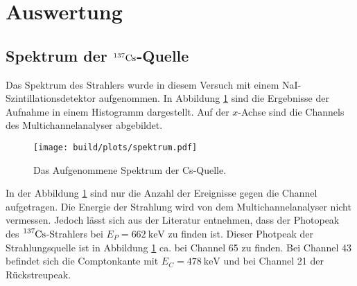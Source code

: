 \newpage 
\section{Auswertung}

  \subsection{Spektrum der $^{137}\text{Cs}$-Quelle}
    Das Spektrum des Strahlers wurde in diesem Versuch mit einem NaI-Szintillationsdetektor aufgenommen. 
    In Abbildung \ref{fig:Spektrum} sind die Ergebnisse der Aufnahme in einem Histogramm dargestellt. Auf der $x$-Achse sind die Channels des Multichannelanalyser abgebildet.
    \begin{figure}[H]
      \centering  
      \texttt{[image: build/plots/spektrum.pdf]}
      \caption{Das Aufgenommene Spektrum der Cs-Quelle.}
      \label{fig:Spektrum}
    \end{figure}

    \noindent In der Abbildung \ref{fig:Spektrum} sind nur die Anzahl der Ereignisse gegen die Channel aufgetragen. 
    Die Energie der Strahlung wird von dem Multichannelanalyser nicht vermessen. 
    Jedoch lässt sich aus der Literatur \cite{Peak} entnehmen, dass der Photopeak des $\ce{^{137}Cs}$-Strahlers bei $E_P = \SI{662}{\kilo\electronvolt}$ zu finden ist.
    Dieser Photpeak der Strahlungsquelle ist in Abbildung \ref{fig:Spektrum} ca. bei Channel 65 zu finden. 
    Bei Channel 43 befindet sich die Comptonkante mit $E_C = \SI{478}{\kilo\electronvolt}$ und bei Channel 21 der Rückstreupeak.

